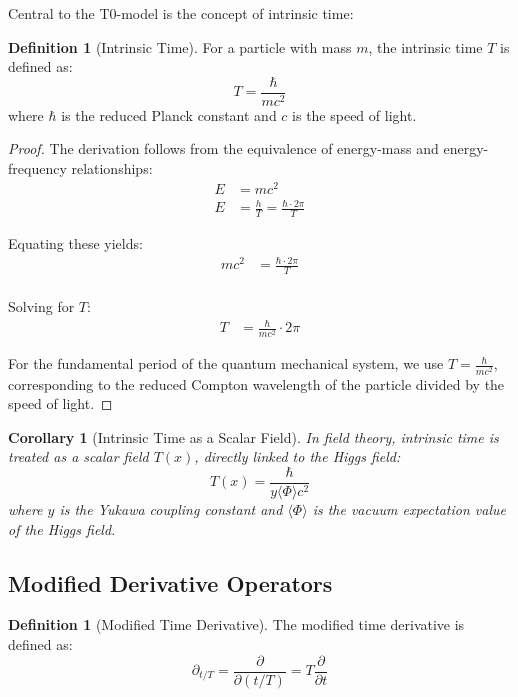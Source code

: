 \documentclass[a4paper,12pt]{article}
\newtheorem{corollary}[theorem]{Corollary} %
\theoremstyle{definition}
\newtheorem{definition}[theorem]{Definition}
\theoremstyle{remark}
\begin{document}
	Central to the T0-model is the concept of intrinsic time:
	
	\begin{definition}[Intrinsic Time]
		For a particle with mass \(m\), the intrinsic time \(T\) is defined as:
		\begin{equation}
			T = \frac{\hbar}{mc^2}
		\end{equation}
		where \(\hbar\) is the reduced Planck constant and \(c\) is the speed of light.
	\end{definition}
	
	\begin{proof}
		The derivation follows from the equivalence of energy-mass and energy-frequency relationships:
		\begin{align}
			E &= mc^2 \\
			E &= \frac{h}{T} = \frac{\hbar \cdot 2\pi}{T}
		\end{align}
		
		Equating these yields:
		\begin{align}
			mc^2 &= \frac{\hbar \cdot 2\pi}{T} \\
		\end{align}
		
		Solving for \(T\):
		\begin{align}
			T &= \frac{\hbar}{mc^2} \cdot 2\pi
		\end{align}
		
		For the fundamental period of the quantum mechanical system, we use \(T = \frac{\hbar}{mc^2}\), corresponding to the reduced Compton wavelength of the particle divided by the speed of light.
	\end{proof}
	
	\begin{corollary}[Intrinsic Time as a Scalar Field]
		In field theory, intrinsic time is treated as a scalar field \(T(x)\), directly linked to the Higgs field:
		\begin{equation}
			T(x) = \frac{\hbar}{y\langle\Phi\rangle c^2}
		\end{equation}
		where \(y\) is the Yukawa coupling constant and \(\langle\Phi\rangle\) is the vacuum expectation value of the Higgs field.
	\end{corollary}
	
	\subsection{Modified Derivative Operators}
	
	\begin{definition}[Modified Time Derivative]
		The modified time derivative is defined as:
		\begin{equation}
			\partial_{t/T} = \frac{\partial}{\partial(t/T)} = T\frac{\partial}{\partial t}
		\end{equation}
	\end{definition}
	
\end{document}
